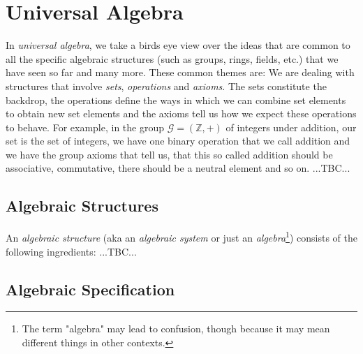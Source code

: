 \section{Universal Algebra}
In \emph{universal algebra}, we take a birds eye view over the ideas that are common to all the specific algebraic structures (such as groups, rings, fields, etc.) that we have seen so far and many more. These common themes are: We are dealing with structures that involve \emph{sets}, \emph{operations} and \emph{axioms}. The sets constitute the backdrop, the operations define the ways in which we can combine set elements to obtain new set elements and the axioms tell us how we expect these operations to behave. For example, in the group $\mathcal{G} = (\mathbb{Z},+)$ of integers under addition, our set is the set of integers, we have one binary operation that we call addition and we have the group axioms that tell us, that this so called addition should be associative, commutative, there should be a neutral element and so on. ...TBC...


\subsection{Algebraic Structures}
An \emph{algebraic structure} (aka an \emph{algebraic system} or just an \emph{algebra}\footnote{The term "algebra" may lead to confusion, though because it may mean different things in other contexts.}) consists of the following ingredients: ...TBC...




\subsection{Algebraic Specification}

